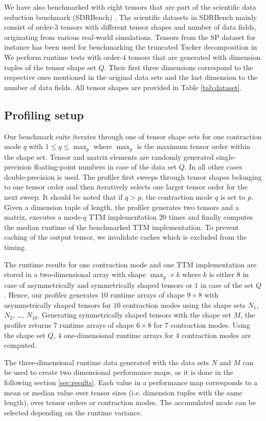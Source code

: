 We have also benchmarked with eight tensors that are part of the scientific data reduction benchmark (SDRBench) \cite{zhao:2020:sdrbench}.
The scientific datasets in SDRBench mainly consist of order-$3$ tensors with different tensor shapes and number of data fields, originating from various real-world simulations.
Tensors from the SP dataset for instance has been used for benchmarking the truncated Tucker decomposition in \cite{ballard:2020:tuckermpi}
We perform runtime tests with order-$4$ tensors that are generated with dimension tuples of the tensor shape set $Q$.
Their first three dimensions correspond to the respective ones mentioned in the original data sets and the last dimension to the number of data fields.
All tensor shapes are provided in Table \ref{tab:dataset}.


\subsection{Profiling setup} 
Our benchmark suite iterates through one of tensor shape sets for one contraction mode $q$ with $1 \leq q \leq \max_p$ where $\max_p$ is the maximum tensor order within the shape set.
Tensor and matrix elements are randomly generated single-precision floating-point numbers in case of the data set $Q$.
In all other cases double-precision is used.
The profiler first sweeps through tensor shapes belonging to one tensor order and then iteratively selects one larger tensor order for the next sweep.
It should be noted that if $q>p$, the contraction mode $q$ is set to $p$.
Given a dimension tuple of length, the profiler generates two tensors and a matrix, executes a mode-$q$ TTM implementation $20$ times and finally computes the median runtime of the benchmarked TTM implementation.
To prevent caching of the output tensor, we invalidate caches which is excluded from the timing.
 
The runtime results for one contraction mode and one TTM implementation are stored in a two-dimensional array with shape $\max_p \times k$ where $k$ is either $8$ in case of asymmetrically and symmetrically shaped tensors or $1$ in case of the set $Q$.
Hence, our profiler generates $10$ runtime arrays of shape $9\times 8$ with asymmetrically shaped tensors for $10$ contraction modes using the shape sets $N_1$, $N_2$, \dots, $N_{10}$.
Generating symmetrically shaped tensors with the shape set $M$, the profiler returns $7$ runtime arrays of shape $6 \times 8$ for $7$ contraction modes.
Using the shape set $Q$, $4$ one-dimensional runtime arrays for $4$ contraction modes are computed.

The three-dimensional runtime data generated with the data sets $N$ and $M$ can be used to create two dimensional performance maps, as it is done in the following section \ref{sec:results}.
Each value in a performance map corresponds to a mean or median value over tensor sizes (i.e. dimension tuples with the same length), over tensor orders or contraction modes.
The accumulated mode can be selected depending on the runtime variance.
